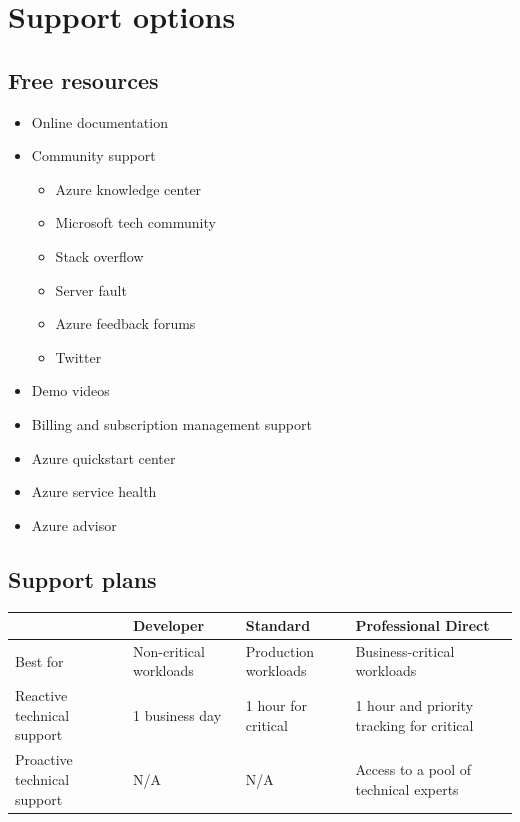 \documentclass{article}[18pt]
\begin{document}
\section{Support options}
\subsection{Free resources}
\begin{itemize}
	\item Online documentation
	\item Community support
	\begin{itemize}
		\item Azure knowledge center
		\item Microsoft tech community
		\item Stack overflow
		\item Server fault
		\item Azure feedback forums
		\item Twitter
	\end{itemize}
	\item Demo videos
	\item Billing and subscription management support
	\item Azure quickstart center
	\item Azure service health
	\item Azure advisor
\end{itemize}
\subsection{Support plans}
{\renewcommand{\arraystretch}{2}
	\begin{tabularx}{\textwidth}{|L|L|L|L|}
		\hline
		& Developer & Standard & Professional Direct\\
		\hline
		Best for& Non-critical workloads&Production workloads & Business-critical workloads\\
		\hline
		Reactive technical support& 1 business day& 1 hour for critical& 1 hour and priority tracking for critical\\
		\hline
		Proactive technical support& N/A & N/A & Access to a pool of technical experts\\
		\hline
		
	\end{tabularx}
}
\end{document}
